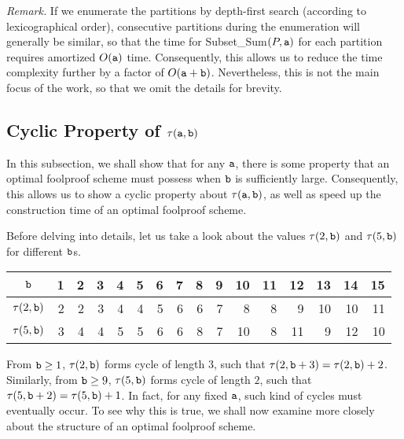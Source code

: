\medskip

\noindent
{\it Remark.} If we enumerate the partitions by depth-first search (according to lexicographical order), 
                      consecutive partitions during the enumeration will generally be similar, so that 
                      the time for Subset\_Sum$(P,\mathtt{a})$ for each partition requires amortized $O(\mathtt{a})$ time.
                     Consequently, this allows us to reduce the time complexity further by a factor of $O(\mathtt{a}+\mathtt{b})$.
                     Nevertheless, this is not the main focus of the work, so that we omit the details for brevity.

\subsection{Cyclic Property of $\tau(\mathtt{a},\mathtt{b})$}
In this subsection, we shall show that for any $\mathtt{a}$, 
there is some property that an optimal foolproof scheme must possess when $\mathtt{b}$ is sufficiently large.
Consequently, this allows us to show a cyclic property about $\tau(\mathtt{a},\mathtt{b})$, 
as well as speed up the construction time of an optimal foolproof scheme. 

\medskip

\noindent
Before delving into details, let us take a look about the values $\tau(2,\mathtt{b})$ and $\tau(5,\mathtt{b})$ for different $\mathtt{b}$s.

\medskip

\begin{tabular}{c|rrrrrrrrrrrrrrr}
$\mathtt{b}$ &  1 &  2 &  3 &  4 &  5 &  6 &  7 &  8 &  9 & 10 & 11 & 12 & 13 & 14 & 15  \\
\hline
$\tau(2,\mathtt{b})$  &  2 &  2 &  3 &  4 &  4 &  5 &  6 &  6 &  7 &  8 &  8 &  9 & 10 & 10 & 11 \\
$\tau(5,\mathtt{b})$        &  3 &  4 &  4 &  5 &  5 &  6 &  6 &  8 &  7 & 10 &  8 & 11 &  9 & 12 & 10  \\
\hline
\end{tabular}

\medskip

\noindent
From $\mathtt{b}\geq 1$, $\tau(2,\mathtt{b})$ forms cycle of length $3$, such that $\tau(2,\mathtt{b}+3) = \tau(2,\mathtt{b}) + 2$.
Similarly, from $\mathtt{b}\geq 9$, $\tau(5,\mathtt{b})$ forms cycle of length $2$, such that $\tau(5,\mathtt{b}+2) = \tau(5,\mathtt{b}) + 1$.
In fact, for any fixed $\mathtt{a}$, such kind of cycles must eventually occur.  
To see why this is true, we shall now examine more closely about the structure of an optimal foolproof scheme.  

\medskip

